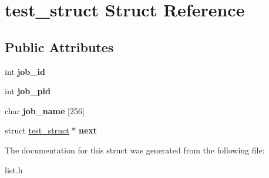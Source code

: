 \hypertarget{structtest__struct}{\section{test\-\_\-struct Struct Reference}
\label{structtest__struct}
}
\subsection*{Public Attributes}
\begin{DoxyCompactItemize}
\item 
\hypertarget{structtest__struct_a8a2b6393a9b5851db448c429b5910abc}{int {\bfseries job\-\_\-id}}\label{structtest__struct_a8a2b6393a9b5851db448c429b5910abc}

\item 
\hypertarget{structtest__struct_a68644e7d37db4c742e1db0e2db3c46af}{int {\bfseries job\-\_\-pid}}\label{structtest__struct_a68644e7d37db4c742e1db0e2db3c46af}

\item 
\hypertarget{structtest__struct_ade5a2ead0caf9463d07df286b305bd3b}{char {\bfseries job\-\_\-name} \mbox{[}256\mbox{]}}\label{structtest__struct_ade5a2ead0caf9463d07df286b305bd3b}

\item 
\hypertarget{structtest__struct_a0d24ff8d701b6023cf93175344debdad}{struct \hyperlink{structtest__struct}{test\-\_\-struct} $\ast$ {\bfseries next}}\label{structtest__struct_a0d24ff8d701b6023cf93175344debdad}

\end{DoxyCompactItemize}


The documentation for this struct was generated from the following file\-:\begin{DoxyCompactItemize}
\item 
list.\-h\end{DoxyCompactItemize}
